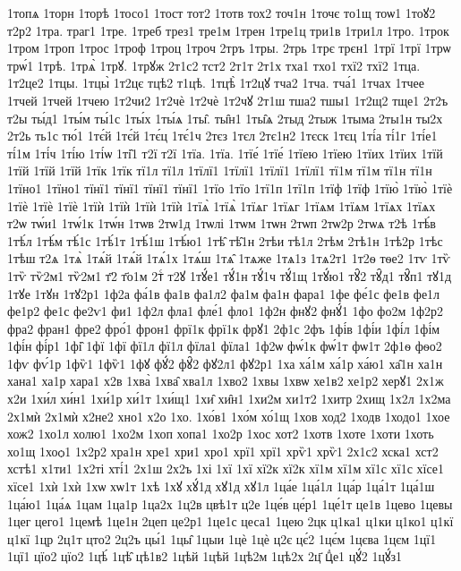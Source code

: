 {1топѧ
1торн
1торѣ
1тосо1
1тост
тот2
1тотв
тох2
точ1н
1точє
то1щ
тоѡ1
1тоꙋ2
т2р2
1тра.
траг1
1тре.
1треб
трез1
тре1м
1трен
1тре1ц
три1в
1три1л
1тро.
1трок
1тром
1троп
1трос
1троф
1троц
1троч
2тръ
1тры.
2трь
1трє
трєн1
1трї
1трї
1трѡ
трѡ́1
1трѣ.
1трѧ̀
1трꙋ.
1трꙋж
2т1с2
тст2
2т1т
2т1х
тха1
тхо1
тхї2
тхї2
1тца.
1т2це2
1тцы.
1тцы̀
1т2цє
тцѣ2
т1цѣ.
1тцѣ̀
1т2цꙋ
тча2
1тча.
тча́1
1тчах
1тчее
1тчей
1тчей
1тчею
1т2чи2
1т2чѐ
1т2чѐ
1т2чꙋ
2т1ш
тша2
тшы1
1т2щ2
тще1
2т2ъ
т2ы
ты́д1
1ты́м
ты́1с
1ты́х
1ты́ѧ
1ты̑.
ты̑н1
1ты̑ѧ
2тыд
2тыж
1тыма
2ты1н
ты2х
2т2ь
ть1с
тю́1
1тє́й
1тє́й
1тє́ц
1тє́1ч
2тєз
1тєл
2тє1н2
1тєск
1тєц
1ті́а
ті́1г
1ті́е1
ті́1м
1ті́ч
1ті́ю
1ті́ѡ
1ті̑1
т2ї
т2ї
1тїа.
1тїа.
1тїе́
1тїе́
1тїею
1тїею
1тїих
1тїих
1тїй
1тїй
1тїй
1тїй
1тїк
1тїк
тї1л
тї1л
1тїлї1
1тїлї1
1тїлї1
1тїлї1
тї1м
тї1м
тї1н
тї1н
1тїно1
1тїно1
тїнї1
тїнї1
тїнї1
тїнї1
1тїо
1тїо
1тї1п
1тї1п
1тїф
1тїф
1тїю̀
1тїю̀
1тїѐ
1тїѐ
1тїѐ
1тїѐ
1тїѝ
1тїѝ
1тїѝ
1тїѝ
1тїѧ̀
1тїѧ̀
1тїѧг
1тїѧг
1тїѧм
1тїѧм
1тїѧх
1тїѧх
т2ѡ
тѡ́и1
1тѡ́1к
1тѡ́н
1тѡв
2тѡ1д
1тѡлі
1тѡм
1тѡн
2тѡп
2тѡ2р
2тѡѧ
т2ѣ
1тѣ́в
1тѣ́л
1тѣ́м
тѣ́1с
1тѣ́1т
1тѣ́1ш
1тѣ́ю1
1тѣ̑
тѣ̑1н
2тѣи
тѣ1л
2тѣм
2тѣ1н
1тѣ2р
1тѣс
1тѣш
т2ѧ
1тѧ̀
1тѧ́й
1тѧ́й
1тѧ́1х
1тѧ́ш
1тѧ̑
1тѧже
1тѧ1з
1тѧ2т1
1т2ѳ
тѳе2
1тѵ
1тѷ
1тѷ
тѷ2м1
тѷ2м1
т҃2
т҃о1м
2тⷭ
т2ꙋ
1тꙋ́е1
тꙋ́1н
тꙋ́1ч
тꙋ́1щ
1тꙋ́ю1
тꙋ̑2
тꙋ̑д1
тꙋ̑п1
тꙋ1д
1тꙋе
1тꙋн
1тꙋ2р1
1ф2а
фа́1в
фа1в
фа1л2
фа1м
фа1н
фара1
1фе
фе́1с
фе1в
фе1л
фе1р2
фе1с
фе2ѵ1
фи1
1ф2л
фла1
фле́1
фло1
1ф2н
фнꙋ2
фнꙋ́1
1фо
фо2м
1ф2р2
фра2
фран1
фре2
фро́1
фрон1
фрї1к
фрї1к
фрꙋ1
2ф1с
2фъ
1фі́в
1фі́и
1фі́л
1фі́м
1фі́н
фі́р1
1фі̑
1фї
1фї
фї1л
фї1л
фїла1
фїла1
1ф2ѡ
фѡ́1к
фѡ́1т
фѡ1т
2ф1ѳ
фѳо2
1фѵ
фѵ́1р
1фѷ1
1фѷ1
1фꙋ
фꙋ́2
фꙋ̑2
фꙋ2л1
фꙋ2р1
1ха
ха́1м
ха́1р
ха́ю1
ха̑1н
ха1н
хана1
ха1р
хара1
х2в
1хва̀
1хва̑
хва1л
1хво2
1хвы
1хвѡ
хе1в2
хе1р2
херꙋ1
2х1ж
х2и
1хи́л
хи́н1
1хи́1р
хи́1т
1хи́щ1
1хи̑
хи̑н1
1хи2м
хи1т2
1хитр
2хищ
1х2л
1х2ма
2х1мѝ
2х1мѝ
х2не2
хно1
х2о
1хо.
1хо́в1
1хо́м
хо́1щ
1хов
ход2
1ходв
1ходо1
1хое
хож2
1хо1л
холю1
1хо2м
1хоп
хопа1
1хо2р
1хос
хот2
1хотв
1хоте
1хоти
1хоть
хо1щ
1хоѻ1
1х2р2
хра1н
хре1
хри1
хро1
хрї1
хрї1
хрѷ1
хрѷ1
2х1с2
хска1
хст2
хстѣ1
х1ти1
1х2ті
хті́1
2х1ш
2х2ъ
1хі
1хї
1хї
хї2к
хї2к
хї1м
хї1м
хї1с
хї1с
хїсе1
хїсе1
1хѝ
1хѝ
1хѡ
хѡ1т
1хѣ
1хꙋ
хꙋ́1д
хꙋ1д
хꙋ1л
1ца́е
1ца́1л
1ца́р
1ца́1т
1ца́1ш
1ца́ю1
1ца́ѧ
1цам
1ца1р
1ца2х
1ц2в
цвѣ1т
ц2е
1це́в
це́р1
1це́1т
це1в
1цево
1цевы
1цег
цего1
1цемѣ
1це1н
2цеп
це2р1
1це1с
цеса1
1цею
2цк
ц1ка1
ц1ки
ц1ко1
ц1кї
ц1кї
1цр
2ц1т
цто2
2ц2ъ
цы́1
1цы̑
1цыи
1цѐ
1цѐ
ц2є
цє́2
1цє́м
1цєва
1цєм
1цї1
1цї1
цїо2
цїо2
1цѣ́
1цѣ̑
цѣ1в2
1цѣй
1цѣй
1цѣ2м
1цѣ2х
2ц҃
цⷣе1
цꙋ́2
1цꙋ́з1
}
